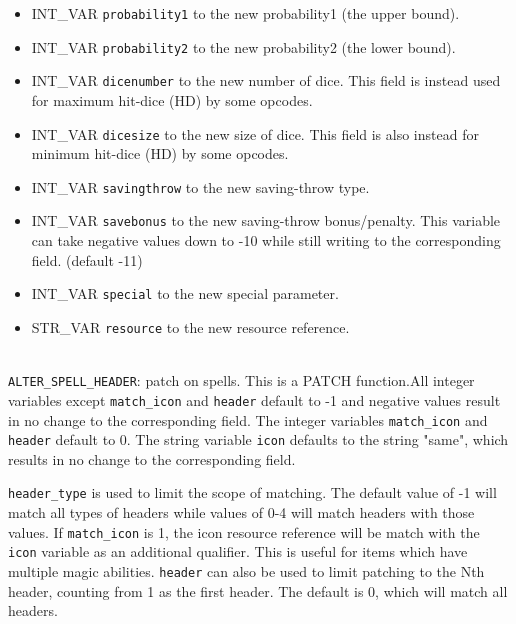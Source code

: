 \documentclass{article}
\begin{document}
\begin{itemize}
\item INT_VAR \verb+probability1+ to the new probability1 (the upper bound).
\item INT_VAR \verb+probability2+ to the new probability2 (the lower bound).
\item INT_VAR \verb+dicenumber+ to the new number of dice. This field is instead used for maximum hit-dice (HD) by some opcodes.
\item INT_VAR \verb+dicesize+ to the new size of dice. This field is also instead for minimum hit-dice (HD) by some opcodes.
\item INT_VAR \verb+savingthrow+ to the new saving-throw type.
\item INT_VAR \verb+savebonus+ to the new saving-throw bonus/penalty. This variable can take negative values down to -10 while still writing to the corresponding field. (default -11)
\item INT_VAR \verb+special+ to the new special parameter.
\item STR_VAR \verb+resource+ to the new resource reference.
\end{itemize}
\\

\verb+ALTER_SPELL_HEADER+: patch  on spells. This is a PATCH function.All integer variables except \verb+match_icon+ and \verb+header+ default to -1 and negative values result in no change to the corresponding field. The integer variables \verb+match_icon+ and \verb+header+ default to 0. The string variable \verb+icon+ defaults to the string "same", which results in no change to the corresponding field.

\verb+header_type+ is used to limit the scope of matching. The default value of -1 will match all types of headers while values of 0-4 will match headers with those values. If \verb+match_icon+ is 1, the icon resource reference will be match with the \verb+icon+ variable as an additional qualifier. This is useful for items which have multiple magic abilities. \verb+header+ can also be used to limit patching to the Nth header, counting from 1 as the first header. The default is 0, which will match all headers.
\end{document}
